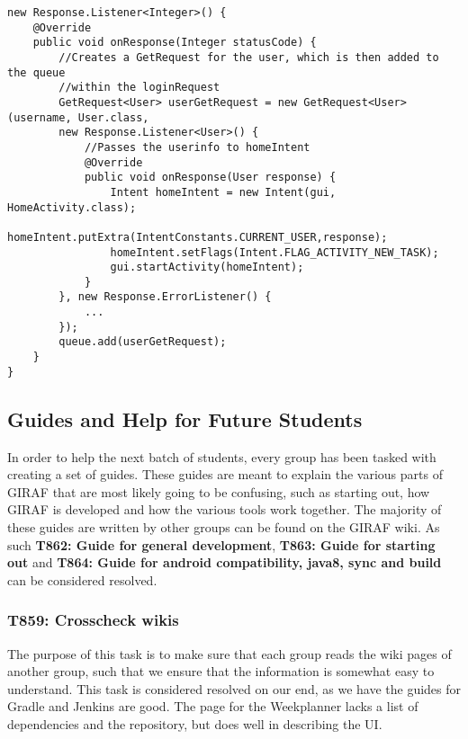 \begin{minipage}[H]{\linewidth}
\begin{lstlisting}[caption = If the user information is authenticated we proceed
with a request for user, label = userReq] new Response.Listener<Integer>() {
	@Override
    public void onResponse(Integer statusCode) {
    	//Creates a GetRequest for the user, which is then added to the queue
    	//within the loginRequest 
    	GetRequest<User> userGetRequest = new GetRequest<User>(username, User.class, 
    	new Response.Listener<User>() {
        	//Passes the userinfo to homeIntent
            @Override
            public void onResponse(User response) {
            	Intent homeIntent = new Intent(gui, HomeActivity.class);
                homeIntent.putExtra(IntentConstants.CURRENT_USER,response);
                homeIntent.setFlags(Intent.FLAG_ACTIVITY_NEW_TASK);
                gui.startActivity(homeIntent);
            }
        }, new Response.ErrorListener() {
			...
        });
        queue.add(userGetRequest);
	}
}
\end{lstlisting}
\end{minipage}



\subsection{Guides and Help for Future Students}
In order to help the next batch of students, every group has been tasked with
creating a set of guides. These guides are meant to explain the various
parts of GIRAF that are most likely going to be confusing, such as starting out,
how GIRAF is developed and how the various tools work together. The
majority of these guides are written by other groups can be found on the GIRAF
wiki\citep{GWiki}. As such \textbf{T862: Guide for general development},
\textbf{T863: Guide for starting out} and \textbf{T864: Guide for android
compatibility, java8, sync and build} can be considered resolved.

\subsubsection{T859: Crosscheck wikis}
The purpose of this task is to make sure that each group reads the wiki pages of
another group, such that we ensure that the information is somewhat easy to
understand. This task is considered resolved on our end, as we have the guides
for Gradle and Jenkins are good. The page for the Weekplanner lacks a
list of dependencies and the repository, but does well in describing the UI.

